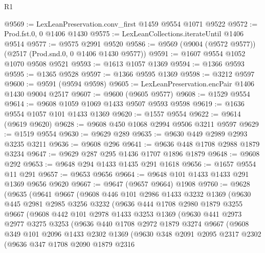 \begin{lexlean}{R1}
\begin{coremodule}
@9569 := LexLeanPreservation.conv_first @1459 @9554 @1071 @9522
@9572 := Prod.fst.{0, 0} @1406 @1430
@9575 := LexLeanCollections.iterateUntil @1406 @9514
@9577 := @9575 @2991 @9520
@9586 := @9569 (@9004 (@9572 @9577)) (@2517 (Prod.snd.{0, 0} @1406 @1430 @9577))
@9591 := @1607 @9554 @1052 @1070 @9508 @9521
@9593 := @1613 @1057 @1369
@9594 := @1366 @9593
@9595 := @1365 @9528
@9597 := @1366 @9595 @1369
@9598 := @3212 @9597
@9600 := @9591 (@9594 @9598)
@9605 := LexLeanPreservation.encPair @1406 @1430 @9004 @2517
@9607 := @9600 (@9605 @9577)
@9608 := @1529 @9554
@9614 := @9608 @1059 @1069 @1433 @9507 @9593 @9598
@9619 := @1636 @9554 @1057 @101 @1433 @1369
@9620 := @1557 @9554
@9622 := @9614 (@9619 @9620)
@9628 := @9608 @450 @1068 @2994 @9506 @3211 @9597
@9629 := @1519 @9554
@9630 := @9629 @289
@9635 := @9630 @449 @2989 @2993 @3235 @3211
@9636 := @9608 @296
@9641 := @9636 @448 @1708 @2988 @1879 @3234
@9647 := @9629 @287 @295 @1436 @1707 @1896 @1879
@9648 := @9608 @292
@9653 := @9648 @294 @1433 @1435 @291 @1618
@9656 := @1657 @9554 @11 @291
@9657 := @9653 @9656
@9664 := @9648 @101 @1433 @1433 @291 @1369 @9656 @9620
@9667 := @9647 (@9657 @9664) @1908
@9760 := @9628
    (@9635
      (@9641
        @9667
        (@9608
          @446
          @101
          @2986
          @1433
          @3232
          @1369
          (@9630
            @445
            @2981
            @2985
            @3256
            @3232
            (@9636
              @444
              @1708
              @2980
              @1879
              @3255
              @9667
              (@9608
                @442
                @101
                @2978
                @1433
                @3253
                @1369
                (@9630
                  @441
                  @2973
                  @2977
                  @3275
                  @3253
                  (@9636
                    @440
                    @1708
                    @2972
                    @1879
                    @3274
                    @9667
                    (@9608
                      @349
                      @101
                      @2096
                      @1433
                      @2302
                      @1369
                      (@9630
                        @348
                        @2091
                        @2095
                        @2317
                        @2302
                        (@9636
                          @347
                          @1708
                          @2090
                          @1879
                          @2316

\end{coremodule}
\end{lexlean}

